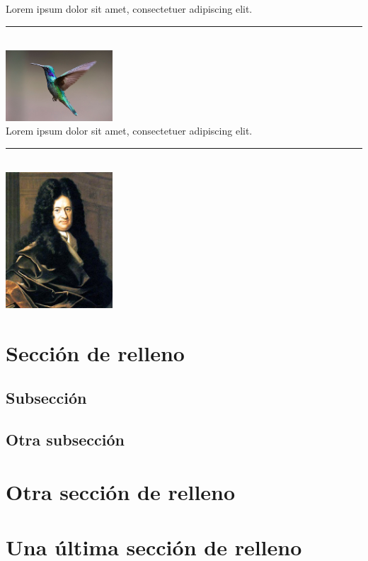 \documentclass[12pt,a4paper,twoside]{article}
\begin{document}
\noindent Lorem ipsum dolor sit amet, consectetuer adipiscing elit.\\
\noindent\rule[2mm]{4cm}{3mm}\\
\noindent\includegraphics[width=4cm]{images/bird.jpg}\\
\noindent Lorem ipsum dolor sit amet, consectetuer adipiscing elit.\\
\noindent\rule[10pt]{4cm}{3mm}\\
\noindent\includegraphics[width=4cm]{images/GWLeibniz.png}




\section{Sección de relleno}

\lipsum[1-15]

\subsection{Subsección}

\lipsum[1-15]

\subsection{Otra subsección}

\lipsum[1-15]		

\section{Otra sección de relleno}

\lipsum[1-15]		

\section{Una última sección de relleno}

\lipsum[1-15]
\end{document}
